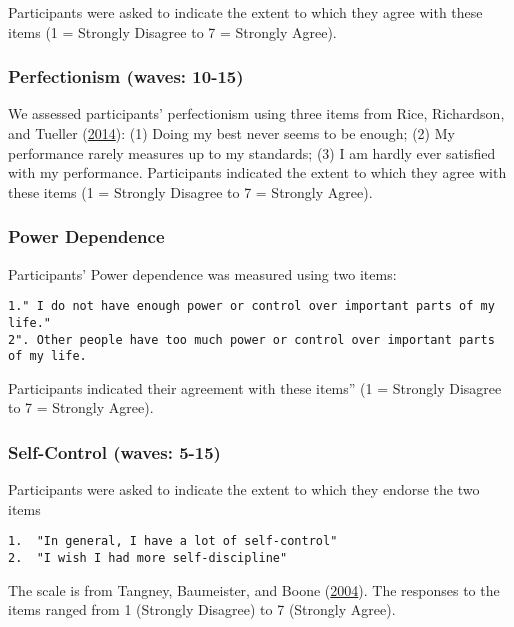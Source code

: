 \documentclass[
  singlecolumn]{report}
\begin{document}
Participants were asked to indicate the extent to which they agree with
these items (1 = Strongly Disagree to 7 = Strongly Agree).

\hypertarget{perfectionism-waves-10-15}{%
\subsubsection{Perfectionism (waves:
10-15)}\label{perfectionism-waves-10-15}}

We assessed participants' perfectionism using three items from Rice,
Richardson, and Tueller (\protect\hyperlink{ref-rice_short_2014}{2014}):
(1) Doing my best never seems to be enough; (2) My performance rarely
measures up to my standards; (3) I am hardly ever satisfied with my
performance. Participants indicated the extent to which they agree with
these items (1 = Strongly Disagree to 7 = Strongly Agree).

\hypertarget{power-dependence}{%
\subsubsection{Power Dependence}\label{power-dependence}}

Participants' Power dependence was measured using two items:

\begin{verbatim}
1." I do not have enough power or control over important parts of my life."
2". Other people have too much power or control over important parts of my life. 
\end{verbatim}

Participants indicated their agreement with these items'' (1 = Strongly
Disagree to 7 = Strongly Agree).

\hypertarget{self-control-waves-5-15}{%
\subsubsection{Self-Control (waves:
5-15)}\label{self-control-waves-5-15}}

Participants were asked to indicate the extent to which they endorse the
two items

\begin{verbatim}
1.  "In general, I have a lot of self-control"
2.  "I wish I had more self-discipline"
\end{verbatim}

The scale is from Tangney, Baumeister, and Boone
(\protect\hyperlink{ref-tangney_high_2004}{2004}). The responses to the
items ranged from 1 (Strongly Disagree) to 7 (Strongly Agree).
\end{document}
